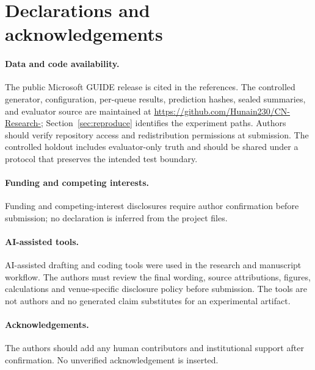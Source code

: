 \section{Declarations and acknowledgements}
\paragraph{Data and code availability.} The public Microsoft GUIDE release is cited in the references. The controlled generator, configuration, per-queue results, prediction hashes, sealed summaries, and evaluator source are maintained at \url{https://github.com/Hunain230/CN-Research-}; Section~\ref{sec:reproduce} identifies the experiment paths. Authors should verify repository access and redistribution permissions at submission. The controlled holdout includes evaluator-only truth and should be shared under a protocol that preserves the intended test boundary.
\paragraph{Funding and competing interests.} Funding and competing-interest disclosures require author confirmation before submission; no declaration is inferred from the project files.
\paragraph{AI-assisted tools.} AI-assisted drafting and coding tools were used in the research and manuscript workflow. The authors must review the final wording, source attributions, figures, calculations and venue-specific disclosure policy before submission. The tools are not authors and no generated claim substitutes for an experimental artifact.
\paragraph{Acknowledgements.} The authors should add any human contributors and institutional support after confirmation. No unverified acknowledgement is inserted.
